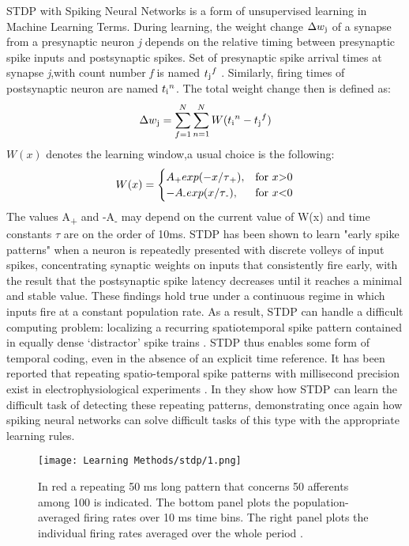 \documentclass[12pt]{report}
\begin{document}
STDP with Spiking Neural Networks is a form of unsupervised learning in Machine Learning Terms. During learning, the weight change \(\Delta w\textsubscript{j}\) of a synapse from a presynaptic neuron \textit{j} depends on the relative timing between presynaptic spike inputs and postsynaptic spikes. Set of presynaptic spike arrival times at synapse \textit{j},with count number \textit{f} is named \(t\textsubscript{j}^f\) . Similarly, firing times of postsynaptic neuron are named \(t\textsubscript{i}^n\). The total weight change then \cite{Gerstner1996} is defined as: 
\begin{equation}
\Delta w\textsubscript{j}=\sum_{f=1}^N\sum_{n=1}^N W(t\textsubscript{i}^n-t\textsubscript{j}^f)
\end{equation}
\(W(x)\) denotes the learning window,a usual choice is the following:
$$
W(x)=\begin{cases}
			A\textsubscript{+}exp(-x/\tau\textsubscript{+}), & \text{for $x$\textgreater0}\\
            -A\textsubscript{-}exp(x/\tau\textsubscript{-}), & \text{for $x$\textless0}
		 \end{cases}
$$
The values A\textsubscript{+} and -A\textsubscript{-} may depend on the current value of W(x) and time constants \(\tau\) are on the order of 10ms. STDP has been shown to learn "early spike patterns" when a neuron is repeatedly presented with discrete volleys of input spikes, concentrating synaptic weights on inputs that consistently fire early, with the result that the postsynaptic spike latency decreases until it reaches a minimal and stable value. These findings hold true under a continuous regime in which inputs fire at a constant population rate. As a result, STDP can handle a difficult computing problem: localizing a recurring spatiotemporal spike pattern contained in equally dense ‘distractor' spike trains \cite{Masquelier2008}. STDP thus enables some form of temporal coding, even in the absence of an explicit time reference. It has been reported that repeating spatio-temporal spike patterns with millisecond precision exist in electrophysiological experiments \cite{Fellous2004}. In \cite{Masquelier2008} they show how STDP can learn the difficult task of detecting these repeating patterns, demonstrating once again how spiking neural networks can solve difficult tasks of this type with the appropriate learning rules.

\begin{figure}[htp]
    \centering
    \texttt{[image: Learning Methods/stdp/1.png]}
    \caption{In red a repeating 50 ms long pattern that concerns 50 afferents among 100 is indicated. The bottom panel plots the population-averaged firing rates over 10 ms time bins. The right panel plots the individual firing rates averaged over the whole period \cite{Masquelier2008}.}
    \label{fig:stdp-1}
\end{figure}
\end{document}
